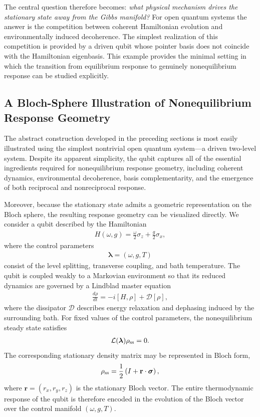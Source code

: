 The central question therefore becomes:
\emph{what physical mechanism drives the stationary
state away from the Gibbs manifold?}
For open quantum systems the answer is the competition
between coherent Hamiltonian evolution and
environmentally induced decoherence. The simplest
realization of this competition is provided by a driven
qubit whose pointer basis does not coincide with the
Hamiltonian eigenbasis. This example provides the
minimal setting in which the transition from equilibrium
response to genuinely nonequilibrium response can be
studied explicitly.

\subsection{A Bloch-Sphere Illustration of Nonequilibrium Response Geometry}
The abstract construction developed in the preceding sections is
most easily illustrated using the simplest nontrivial open
quantum system---a driven two-level system. Despite its apparent
simplicity, the qubit captures all of the essential ingredients
required for nonequilibrium response geometry, including coherent
dynamics, environmental decoherence, basis complementarity, and
the emergence of both reciprocal and nonreciprocal response.

Moreover, because the stationary state admits a geometric
representation on the Bloch sphere, the resulting response
geometry can be visualized directly.
We consider a qubit described by the Hamiltonian
\begin{align}
H(\omega,g)
=
\frac{\omega}{2}\sigma_z
+
\frac{g}{2}\sigma_x,
\end{align}
where the control parameters
\begin{align}
\bm{\lambda}
=
(\omega,g,T)
\end{align}
consist of the level splitting, transverse coupling, and bath
temperature. The qubit is coupled weakly to a Markovian
environment so that its reduced dynamics are governed by a
Lindblad master equation
\begin{align}
\frac{d\rho}{dt}
=
-i[H,\rho]
+
\mathcal{D}[\rho],
\end{align}
where the dissipator $\mathcal{D}$ describes energy relaxation
and dephasing induced by the surrounding bath. For fixed values
of the control parameters, the nonequilibrium steady state
satisfies
\begin{align}
\mathcal{L}(\bm{\lambda})
\rho_{\rm ss}
=
0.
\end{align}
The corresponding stationary density matrix may be represented in
Bloch form,
\begin{align}
\rho_{\rm ss}
=
\frac{1}{2}
\left(
I
+
\mathbf{r}\cdot\boldsymbol{\sigma}
\right),
\end{align}
where $\mathbf r=(r_x,r_y,r_z)$ is the stationary Bloch vector.
The entire thermodynamic response of the qubit is therefore
encoded in the evolution of the Bloch vector over the control
manifold $(\omega,g,T)$.

